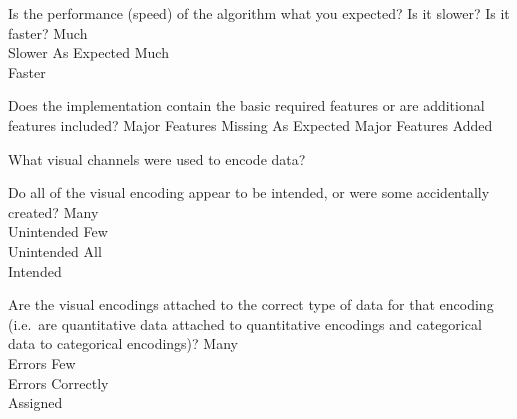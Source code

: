\documentclass[a4paper,12pt]{article}
\begin{document}
	{Is the performance (speed) of the algorithm what you expected? Is 
    	it slower? Is it faster?}
    {\choice Much\\Slower}
    {\choice As Expected}
    {\choice Much\\Faster}
    
	{Does the implementation contain the basic required 
    	features or are additional features included?}
    {\choice Major Features Missing}
    {\choice As Expected}
    {\choice Major Features Added} 
    
\EndTable


\vspace{15pt}



	{What visual channels were used to encode data? }
    { 
    }
        
	{Do all of the visual encoding appear to be intended, or were some accidentally created?}
        {\choice Many\\Unintended}
        {\choice Few\\Unintended}
        {\choice All\\Intended} 
        
	{Are the visual encodings attached to the correct type of data for that 
    	encoding (i.e.\ are quantitative data attached to quantitative 
        encodings and categorical data to categorical encodings)?}
    {\choice Many\\Errors}
    {\choice Few\\Errors}
    {\choice Correctly\\Assigned} 
            
\end{document}
